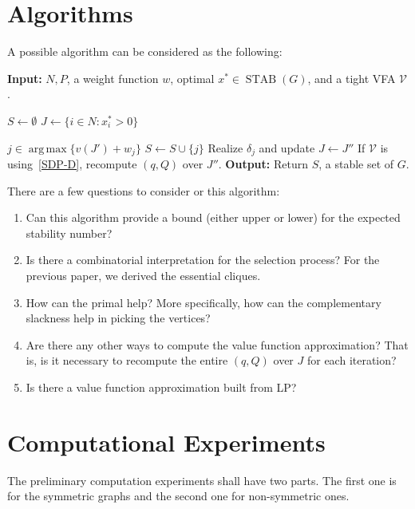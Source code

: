 \documentclass[10pt,leqno]{amsart}
\newcommand{\calV}{\mathcal{V}}
\DeclareMathOperator{\STAB}{STAB}
\DeclareMathOperator*{\argmax}{arg\,max}
\begin{document}
\section{Algorithms}
A possible algorithm can be considered as the following:
\begin{algorithm}[H]
  \begin{algorithmic}[1]
    \State\textbf{Input:} $N,P$, a weight function $w$, optimal $x^*\in\STAB(G)$, and a tight VFA $\calV$.
  \item[\textbf{Phase I:}]
    \State $S \gets \emptyset$
    \State $J \gets \{ i \in N : x_i^* >0 \}$\label{alg_step:subopt by primal}
  \item[\textbf{Phase II:}]
    \State $j\in\argmax\{v(J')+w_j\}$
    \State $S \gets S\cup\{j\}$
    \State Realize $\delta_j$ and update $J\gets J''$
    \State If $\calV$ is using~\eqref{SDP-D}, recompute $(q,Q)$ over $J''$.
    \EndWhile
    \State\textbf{Output:} Return $S$, a stable set of $G$.
  \end{algorithmic}
  \caption{Dynamically VFA Rounding}
  \label{alg:max_VFA}
\end{algorithm}
There are a few questions to consider or this algorithm:
\begin{enumerate}
  \item Can this algorithm provide a bound (either upper or lower) for the expected stability number?
  \item Is there a combinatorial interpretation for the selection process?
    For the previous paper, we derived the essential cliques.
  \item How can the primal help?
    More specifically, how can the complementary slackness help in picking the vertices?
  \item Are there any other ways to compute the value function approximation? That is, is it necessary to recompute the entire $(q,Q)$ over $J$ for each iteration?
  \item Is there a value function approximation built from LP?
\end{enumerate}
\section{Computational Experiments}
The preliminary computation experiments shall have two parts.
The first one is for the symmetric graphs and the second one for non-symmetric ones.
\end{document}
